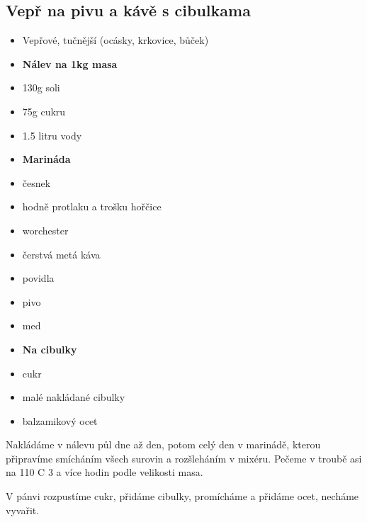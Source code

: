 \documentclass[10pt,a4paper]{article}
\newenvironment{myitemize}
{ \begin{itemize}
    \setlength{\itemsep}{0pt}
    \setlength{\parskip}{0pt}
    \setlength{\parsep}{0pt}     }
{ \end{itemize}                  }
\begin{document}
\subsection{Vepř na pivu a kávě s cibulkama}
\begin{minipage}[t]{0,5\textwidth}
\begin{myitemize} 
\item Vepřové, tučnější (ocásky, krkovice, bůček)
\item \textbf{Nálev na 1kg masa}
\item 130g soli
\item 75g cukru
\item 1.5 litru vody
\item \textbf{Marináda}
\item česnek 
\item hodně protlaku a trošku hořčice
\item worchester
\item čerstvá metá káva
\item povidla
\item pivo
\item med
\item \textbf{Na cibulky}
\item cukr
\item malé nakládané cibulky
\item balzamikový ocet
\end{myitemize}
\end{minipage}
\begin{minipage}[t]{0,5\textwidth}
Nakládáme v nálevu půl dne až den, potom celý den v marinádě, kterou připravíme  smícháním všech surovin a rozšleháním v mixéru.
Pečeme v troubě asi na 110 \degree C 3 a více hodin podle velikosti masa. 

V pánvi rozpustíme cukr, přidáme cibulky, promícháme a přidáme ocet, necháme vyvařit.
\end{minipage}
\end{document}
